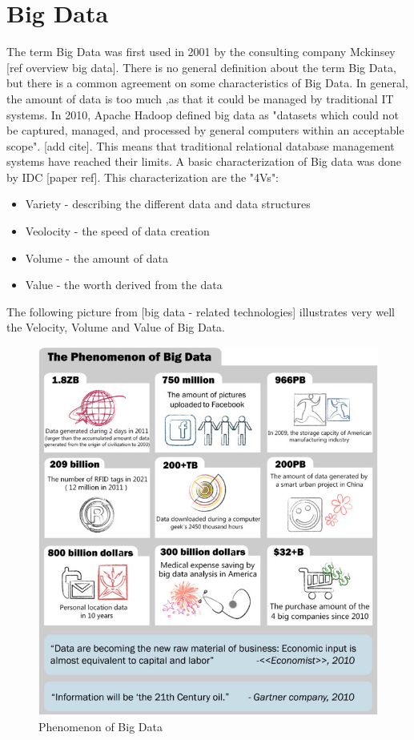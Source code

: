 \documentclass{acm_proc_article-sp}
\begin{document}
\section{Big Data}

The term Big Data was first used in 2001 by the consulting company Mckinsey [ref overview big data]. There is no general definition about the term Big Data, but there is a common agreement on some characteristics of Big Data. In general, the amount of data is too much ,as that it could be managed by traditional IT systems.
In 2010, Apache Hadoop defined big data as "datasets which could not be
captured, managed, and processed by general computers within an acceptable
scope". [add cite]. This means that traditional relational database management systems have reached their limits.
A basic characterization of Big data was done by IDC [paper ref]. This characterization are the "4Vs":
\begin{itemize}
	\item Variety - describing the different data and data structures
	\item Veolocity - the speed of data creation
	\item Volume - the amount of data
	\item Value - the worth derived from the data
\end{itemize}

The following picture from [big data - related technologies] illustrates very well the Velocity, Volume and Value of Big Data.

\begin{figure}[hbtp]
	\centering
	\includegraphics[scale=0.45]{big_data.png}
	\caption{Phenomenon of Big Data}
\end{figure}
\end{document}
